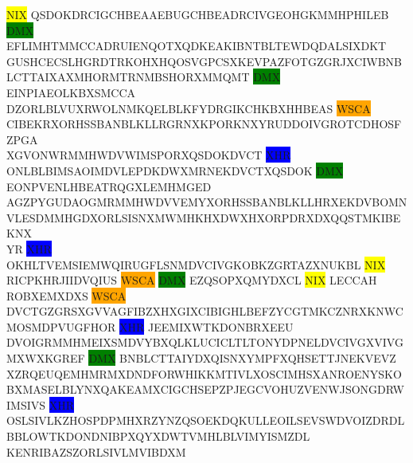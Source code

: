 \documentclass[a4paper,ngerman,12pt]{scrartcl}
\newcommand{\hilight}[2]{%
  \begingroup
  \setlength{\fboxsep}{0pt}%
  \colorbox{#1}{#2}%
  \endgroup
}
\theoremstyle{definition}
\begin{document}
\begin{center}
    \begin{minipage}{0.9\linewidth}
      {\scriptsize\ttfamily
        \hilight{yellow}{NIX}QSDOKDRCIGCHBEAAEBUGCHBEADRCIVGEOHGKMMHPHILEB\hilight{green}{DMX}EFLIMHTMMCCADRUIENQOTXQDKEAKIBNTBLTEWDQDALSIXDKT\\
        GUSHCECSLHGRDTRKOHXHQOSVGPCSXKEVPAZFOTGZGRJXCIWBNBLCTTAIXAXMHORMTRNMBSHORXMMQMT\hilight{green}{DMX}EINPIAEOLKBXSMCCA\\
        DZORLBLVUXRWOLNMKQELBLKFYDRGIKCHKBXHHBEAS\hilight{orange}{WSCA}CIBEKRXORHSSBANBLKLLRGRNXKPORKNXYRUDDOIVGROTCDHOSFZPGA\\
        XGVONWRMMHWDVWIMSPORXQSDOKDVCT\hilight{blue}{XHR}ONLBLBIMSAOIMDVLEPDKDWXMRNEKDVCTXQSDOK\hilight{green}{DMX}EONPVENLHBEATRQGXLEMHMGED\\
        AGZPYGUDAOGMRMMHWDVVEMYXORHSSBANBLKLLHRXEKDVBOMNVLESDMMHGDXORLSISNXMWMHKHXDWXHXORPDRXDXQQSTMKIBEKNX\\
        YR\hilight{blue}{XHR}OKHLTVEMSIEMWQIRUGFLSNMDVCIVGKOBKZGRTAZXNUKBL\hilight{yellow}{NIX}RICPKHRJIIDVQIUS\hilight{orange}{WSCA}\hilight{green}{DMX}EZQSOPXQMYDXCL\hilight{yellow}{NIX}LECCAH\\
        ROBXEMXDXS\hilight{orange}{WSCA}DVCTGZGRSXGVVAGFIBZXHXGIXCIBIGHLBEFZYCGTMKCZNRXKNWCMOSMDPVUGFHOR\hilight{blue}{XHR}JEEMIXWTKDONBRXEEU\\
        DVOIGRMMHMEIXSMDVYBXQLKLUCICLTLTONYDPNELDVCIVGXVIVGMXWXKGREF\hilight{green}{DMX}BNBLCTTAIYDXQISNXYMPFXQHSETTJNEKVEVZ\\
        XZRQEUQEMHMRMXDNDFORWHIKKMTIVLXOSCIMHSXANROENYSKOBXMASELBLYNXQAKEAMXCIGCHSEPZPJEGCVOHUZVENWJSONGDRW\\
        IMSIVS\hilight{blue}{XHR}OSLSIVLKZHOSPDPMHXRZYNZQSOEKDQKULLEOILSEVSWDVOIZDRDLBBLOWTKDONDNIBPXQYXDWTVMHLBLVIMYISMZDL\\
        KENRIBAZSZORLSIVLMVIBDXM
      }
    \end{minipage}
\end{center}
\end{document}
